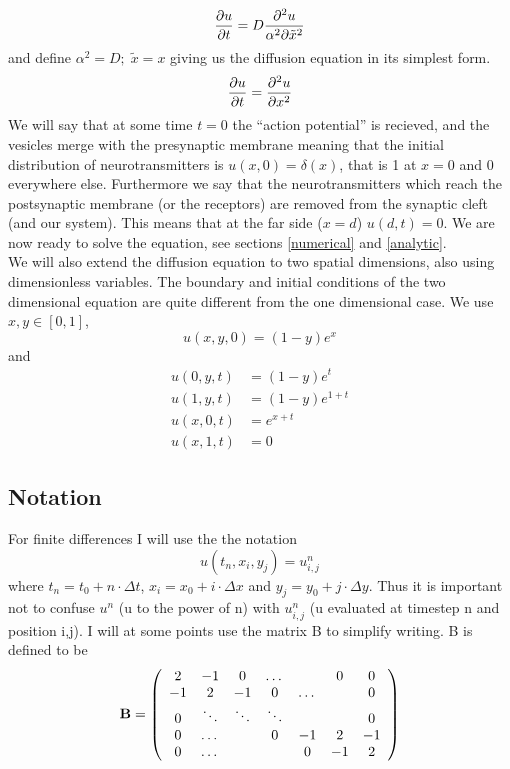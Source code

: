 \documentclass[a4paper,english, 10pt, twoside]{article}
\renewcommand{\d}{\partial}
\begin{document}
\begin{equation*}
 {\d u \over \d t} = D{\d^2 u \over \alpha^2\d\tilde{x}^2}
\end{equation*}
and define $\alpha^2 = D; \; \tilde{x} = x$ giving us the diffusion equation in its simplest form.
\begin{equation*}
 {\d u \over \d t} = {\d^2 u \over \d x^2}
\end{equation*}
We will say that at some time $t = 0$ the ``action potential'' is recieved, and the vesicles merge with the presynaptic membrane meaning that the 
initial distribution of neurotransmitters is $u(x,0) = \delta(x)$, that is 1 at $x = 0$ and 0 everywhere else. Furthermore we say that the 
neurotransmitters which reach the postsynaptic membrane (or the receptors) are removed from the synaptic cleft (and our system). This means that at 
the far side ($x=d$) $u(d,t) = 0$. We are now ready to solve the equation, see sections \ref{numerical} and \ref{analytic}.\\
We will also extend the diffusion equation to two spatial dimensions, also using dimensionless variables. The boundary and initial conditions of 
the two dimensional equation are quite different from the one dimensional case. We use $x,y\in[0,1]$,
$$
u(x,y,0) = (1-y)e^{x}
$$
and
\begin{align*}
 u(0,y,t) &= (1-y)e^{t} \\
 u(1,y,t) &= (1-y)e^{1+t} \\
 u(x,0,t) &= e^{x+t} \\
 u(x,1,t) &= 0
\end{align*}

\subsection{Notation}
For finite differences I will use the the notation 
\begin{equation*}
 u(t_n,x_i,y_j) = u^n_{i,j}
\end{equation*}
where $t_n = t_0 + n\cdot\Delta t$, $x_i = x_0 +i\cdot\Delta x$ and $y_j = y_0 +j\cdot\Delta y$. Thus it is important not to 
confuse $u^n$ (u to the power of n) with $u^n_{i,j}$ (u evaluated at timestep n and position i,j). I will at some points use the 
matrix B to simplify writing. B is defined to be
\begin{align*}
 \mathbf{B} = \left(\begin{array}{c c c c c c c}
        2 & -1 &0 &\dots & &0 &0 \\
        -1 & 2 & -1 &0 &\dots & &0 \\
        0& \ddots & \ddots & \ddots &  &  &0\\
        0& \dots &  &0&-1 & 2 & -1\\
         0& \dots & & &0&-1 & 2 
       \end{array}\right)
\end{align*}
\end{document}

